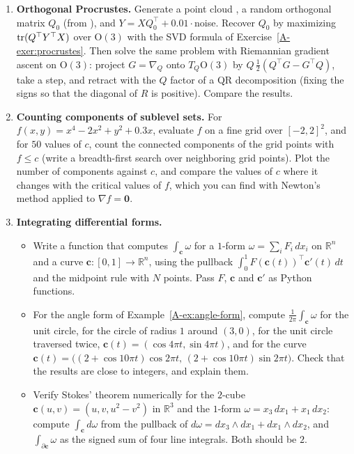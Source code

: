 \begin{enumerate}[label=\textbf{P\arabic*.}, leftmargin=*]
    \item \textbf{Orthogonal Procrustes.} Generate a point cloud , a random orthogonal matrix $Q_0$ (from ), and $Y = XQ_0^\top + 0.01\cdot$noise. Recover $Q_0$ by maximizing $\operatorname{tr}(Q^\top Y^\top X)$ over $\mathrm{O}(3)$ with the SVD formula of Exercise~\ref{A-exer:procrustes}. Then solve the same problem with Riemannian gradient ascent on $\mathrm{O}(3)$: project $G = \nabla_Q$ onto $T_Q \mathrm{O}(3)$ by $Q\,\frac{1}{2}(Q^\top G - G^\top Q)$, take a step, and retract with the $Q$ factor of a QR decomposition (fixing the signs so that the diagonal of $R$ is positive). Compare the results.

    \item \textbf{Counting components of sublevel sets.} For $f(x, y) = x^4 - 2x^2 + y^2 + 0.3x$, evaluate $f$ on a fine grid over $[-2, 2]^2$, and for $50$ values of $c$, count the connected components of the grid points with $f \leq c$ (write a breadth-first search over neighboring grid points). Plot the number of components against $c$, and compare the values of $c$ where it changes with the critical values of $f$, which you can find with Newton's method applied to $\nabla f = \mathbf{0}$.

    \item \textbf{Integrating differential forms.}
    \begin{itemize}
        \item Write a function that computes $\int_{\mathbf{c}} \omega$ for a $1$-form $\omega = \sum_i F_i\, dx_i$ on $\mathbb{R}^n$ and a curve $\mathbf{c}: [0, 1] \to \mathbb{R}^n$, using the pullback $\int_0^1 F(\mathbf{c}(t))^\top\mathbf{c}'(t)\, dt$ and the midpoint rule with $N$ points. Pass $F$, $\mathbf{c}$ and $\mathbf{c}'$ as Python functions.
        \item For the angle form of Example~\ref{A-ex:angle-form}, compute $\frac{1}{2\pi}\int_{\mathbf{c}} \omega$ for the unit circle, for the circle of radius $1$ around $(3, 0)$, for the unit circle traversed twice, $\mathbf{c}(t) = (\cos 4\pi t, \sin 4\pi t)$, and for the curve $\mathbf{c}(t) = \big((2 + \cos 10\pi t)\cos 2\pi t, \, (2 + \cos 10\pi t)\sin 2\pi t\big)$. Check that the results are close to integers, and explain them.
        \item Verify Stokes' theorem numerically for the $2$-cube $\mathbf{c}(u, v) = (u, v, u^2 - v^2)$ in $\mathbb{R}^3$ and the $1$-form $\omega = x_3\, dx_1 + x_1\, dx_2$: compute $\int_{\mathbf{c}} d\omega$ from the pullback of $d\omega = dx_3 \wedge dx_1 + dx_1 \wedge dx_2$, and $\int_{\partial\mathbf{c}} \omega$ as the signed sum of four line integrals. Both should be $2$.
    \end{itemize}


\end{enumerate}
